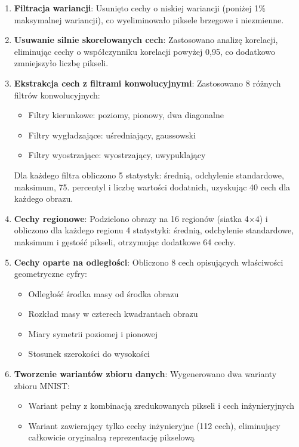 \documentclass[11pt,a4paper]{article}
\begin{document}
\begin{enumerate}
    \item \textbf{Filtracja wariancji}: Usunięto cechy o niskiej wariancji (poniżej 1\% maksymalnej wariancji), co wyeliminowało piksele brzegowe i niezmienne.

    \item \textbf{Usuwanie silnie skorelowanych cech}: Zastosowano analizę korelacji, eliminując cechy o współczynniku korelacji powyżej 0,95, co dodatkowo zmniejszyło liczbę pikseli.

    \item \textbf{Ekstrakcja cech z filtrami konwolucyjnymi}: Zastosowano 8 różnych filtrów konwolucyjnych:
    \begin{itemize}
        \item Filtry kierunkowe: poziomy, pionowy, dwa diagonalne
        \item Filtry wygładzające: uśredniający, gaussowski
        \item Filtry wyostrzające: wyostrzający, uwypuklający
    \end{itemize}
    Dla każdego filtra obliczono 5 statystyk: średnią, odchylenie standardowe, maksimum, 75. percentyl i liczbę wartości dodatnich, uzyskując 40 cech dla każdego obrazu.

    \item \textbf{Cechy regionowe}: Podzielono obrazy na 16 regionów (siatka 4×4) i obliczono dla każdego regionu 4 statystyki: średnią, odchylenie standardowe, maksimum i gęstość pikseli, otrzymując dodatkowe 64 cechy.

    \item \textbf{Cechy oparte na odległości}: Obliczono 8 cech opisujących właściwości geometryczne cyfry:
    \begin{itemize}
        \item Odległość środka masy od środka obrazu
        \item Rozkład masy w czterech kwadrantach obrazu
        \item Miary symetrii poziomej i pionowej
        \item Stosunek szerokości do wysokości
    \end{itemize}

    \item \textbf{Tworzenie wariantów zbioru danych}: Wygenerowano dwa warianty zbioru MNIST:
    \begin{itemize}
        \item Wariant pełny z kombinacją zredukowanych pikseli i cech inżynieryjnych
        \item Wariant zawierający tylko cechy inżynieryjne (112 cech), eliminujący całkowicie oryginalną reprezentację pikselową
    \end{itemize}
\end{enumerate}
\end{document}

